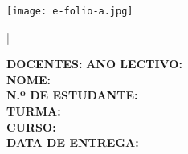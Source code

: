 \begin{center}
\texttt{[image: e-folio-a.jpg]}

{\LARGE \color{red}\UC \; | \codigoUC}
\end{center}

{\footnotesize
\textbf{DOCENTES:} \docentes \hfill \textbf{ANO LECTIVO:} \anoLectivo\\
\textbf{NOME:} \theauthor \hfill \\

\textbf{N.º DE ESTUDANTE:} \numeroEstudante \hfill \\

\textbf{TURMA:} \turma \hfill \\

\textbf{CURSO:} \curso \hfill \\

\textbf{DATA DE ENTREGA:} \thedate \hfill \\
}

